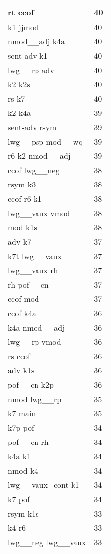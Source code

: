 \documentclass[a4 paper]{article}
\begin{document}
\begin{longtable}{p{}p{}}
rt ccof  & 40 \\ \midrule
k1 jjmod  & 40 \\ \midrule
nmod\_\_adj k4a  & 40 \\ \midrule
sent-adv k1  & 40 \\ \midrule
lwg\_\_rp adv  & 40 \\ \midrule
k2 k2s  & 40 \\ \midrule
rs k7  & 40 \\ \midrule
k2 k4a  & 39 \\ \midrule
sent-adv rsym  & 39 \\ \midrule
lwg\_\_psp mod\_\_wq  & 39 \\ \midrule
r6-k2 nmod\_\_adj  & 39 \\ \midrule
ccof lwg\_\_neg  & 38 \\ \midrule
rsym k3  & 38 \\ \midrule
ccof r6-k1  & 38 \\ \midrule
lwg\_\_vaux vmod  & 38 \\ \midrule
mod k1s  & 38 \\ \midrule
adv k7  & 37 \\ \midrule
k7t lwg\_\_vaux  & 37 \\ \midrule
lwg\_\_vaux rh  & 37 \\ \midrule
rh pof\_\_cn  & 37 \\ \midrule
ccof mod  & 37 \\ \midrule
ccof k4a  & 36 \\ \midrule
k4a nmod\_\_adj  & 36 \\ \midrule
lwg\_\_rp vmod  & 36 \\ \midrule
rs ccof  & 36 \\ \midrule
adv k1s  & 36 \\ \midrule
pof\_\_cn k2p  & 36 \\ \midrule
nmod lwg\_\_rp  & 35 \\ \midrule
k7 main  & 35 \\ \midrule
k7p pof  & 34 \\ \midrule
pof\_\_cn rh  & 34 \\ \midrule
k4a k1  & 34 \\ \midrule
nmod k4  & 34 \\ \midrule
lwg\_\_vaux\_cont k1  & 34 \\ \midrule
k7 pof  & 34 \\ \midrule
rsym k1s  & 33 \\ \midrule
k4 r6  & 33 \\ \midrule
lwg\_\_neg lwg\_\_vaux  & 33 \\ \midrule

\end{longtable}
\end{document}
